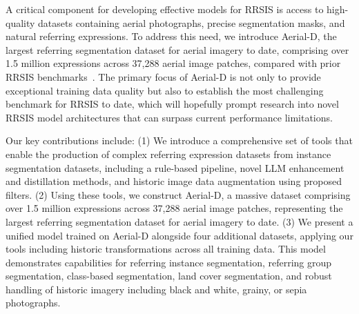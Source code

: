 A critical component for developing effective models for RRSIS is access to high-quality datasets containing aerial photographs, precise segmentation masks, and natural referring expressions. To address this need, we introduce Aerial-D, the largest referring segmentation dataset for aerial imagery to date, comprising over 1.5 million expressions across 37,288 aerial image patches, compared with prior RRSIS benchmarks~\cite{yuan2023rrsis,liu2024rotated,yang2024large}. The primary focus of Aerial-D is not only to provide exceptional training data quality but also to establish the most challenging benchmark for RRSIS to date, which will hopefully prompt research into novel RRSIS model architectures that can surpass current performance limitations.

Our key contributions include: (1) We introduce a comprehensive set of tools that enable the production of complex referring expression datasets from instance segmentation datasets, including a rule-based pipeline, novel LLM enhancement and distillation methods, and historic image data augmentation using proposed filters. (2) Using these tools, we construct Aerial-D, a massive dataset comprising over 1.5 million expressions across 37,288 aerial image patches, representing the largest referring segmentation dataset for aerial imagery to date. (3) We present a unified model trained on Aerial-D alongside four additional datasets, applying our tools including historic transformations across all training data. This model demonstrates capabilities for referring instance segmentation, referring group segmentation, class-based segmentation, land cover segmentation, and robust handling of historic imagery including black and white, grainy, or sepia photographs.
